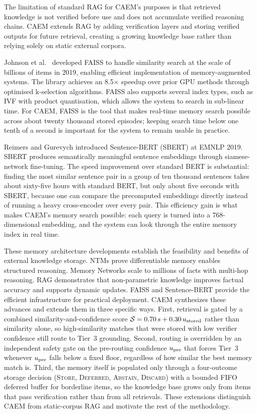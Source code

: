 The limitation of standard RAG for CAEM's purposes is that retrieved knowledge is not verified before use and does not accumulate verified reasoning chains. CAEM extends RAG by adding verification layers and storing verified outputs for future retrieval, creating a growing knowledge base rather than relying solely on static external corpora.

Johnson et al.\ \cite{8733051} developed FAISS to handle similarity search at the scale of billions of items in 2019, enabling efficient implementation of memory-augmented systems. The library achieves an 8.5$\times$ speedup over prior GPU methods through optimised k-selection algorithms. FAISS also supports several index types, such as IVF with product quantisation, which allows the system to search in sub-linear time. For CAEM, FAISS is the tool that makes real-time memory search possible across about twenty thousand stored episodes; keeping search time below one tenth of a second is important for the system to remain usable in practice.

Reimers and Gurevych \cite{reimers-gurevych-2019-sentence} introduced Sentence-BERT (SBERT) at EMNLP 2019. SBERT produces semantically meaningful sentence embeddings through siamese-network fine-tuning. The speed improvement over standard BERT is substantial: finding the most similar sentence pair in a group of ten thousand sentences takes about sixty-five hours with standard BERT, but only about five seconds with SBERT, because one can compare the precomputed embeddings directly instead of running a heavy cross-encoder over every pair. This efficiency gain is what makes CAEM's memory search possible: each query is turned into a 768-dimensional embedding, and the system can look through the entire memory index in real time.

These memory architecture developments establish the feasibility and benefits of external knowledge storage. NTMs prove differentiable memory enables structured reasoning. Memory Networks scale to millions of facts with multi-hop reasoning. RAG demonstrates that non-parametric knowledge improves factual accuracy and supports dynamic updates. FAISS and Sentence-BERT provide the efficient infrastructure for practical deployment. CAEM synthesizes these advances and extends them in three specific ways. First, retrieval is gated by a combined similarity-and-confidence score $\mathcal{S} = 0.70\,s + 0.30\,u_{\text{stored}}$ rather than similarity alone, so high-similarity matches that were stored with low verifier confidence still route to Tier~3 grounding. Second, routing is overridden by an independent safety gate on the pre-routing confidence $u_{\text{pre}}$ that forces Tier~3 whenever $u_{\text{pre}}$ falls below a fixed floor, regardless of how similar the best memory match is. Third, the memory itself is populated only through a four-outcome storage decision (\textsc{Store}, \textsc{Deferred}, \textsc{Abstain}, \textsc{Discard}) with a bounded FIFO deferred buffer for borderline items, so the knowledge base grows only from items that pass verification rather than from all retrievals. These extensions distinguish CAEM from static-corpus RAG and motivate the rest of the methodology.

